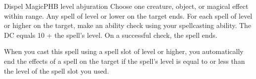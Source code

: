 \begin{spell}{Dispel Magic}{PHB}{ level abjuration}
{
}
Choose one creature, object, or magical effect within
range. Any spell of  level or lower on the target ends.
For each spell of  level or higher on the target, make
an ability check using your spellcasting ability. The
DC equals 10 + the spell's level. On a successful check,
the spell ends.

 When you cast this spell using a
spell slot of  level or higher, you automatically end
the effects of a spell on the target if the spell's level is
equal to or less than the level of the spell slot you used.
\end{spell}